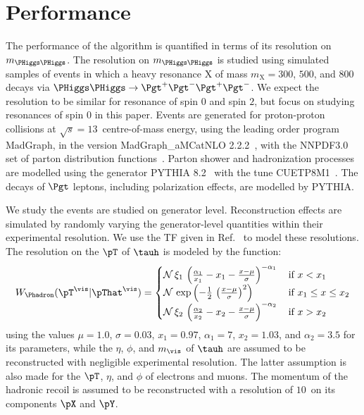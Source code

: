 \section{Performance}
\label{sec:performance}

The performance of the algorithm is quantified in terms of its resolution on $m_{\PHiggs\PHiggs}$.
The resolution on $m_{\PHiggs\PHiggs}$ is studied using simulated samples of events
in which a heavy resonance $\textrm{X}$ of mass $m_{\textrm{X}} = 300$, $500$, and $800$~\GeV
decays via $\PHiggs\PHiggs \to \Pgt^{+}\Pgt^{-}\Pgt^{+}\Pgt^{-}$.
We expect the resolution to be similar for resonance of spin $0$ and spin $2$,
but focus on studying resonances of spin $0$ in this paper.
Events are generated for proton-proton collisions at $\sqrt{s} = 13$~\TeV centre-of-mass energy,
using the leading order program MadGraph, in the version MadGraph\_aMCatNLO 2.2.2~\cite{MadGraph_aMCatNLO},
with the NNPDF3.0 set of parton distribution functions~\cite{NNPDF1,NNPDF2,NNPDF3}.
Parton shower and hadronization processes are modelled using the generator PYTHIA 8.2~\cite{pythia8} with the tune CUETP8M1~\cite{PYTHIA_CUETP8M1tune_CMS}.
The decays of $\Pgt$ leptons, including polarization effects, are modelled by PYTHIA.

We study the events are studied on generator level.
Reconstruction effects are simulated by randomly varying the generator-level quantities within their experimental resolution.
We use the TF given in Ref.~\cite{SVfitMEM} to model these resolutions.
The resolution on the $\pT$ of $\tauh$ is modeled by the function:
\begin{equation}
W_{\Phadron}( \pT^{\vis} | \pThat^{\vis} ) = 
 \begin{cases}
   \mathcal{N} \, \xi_{1} \, \left( \frac{\alpha_{1}}{x_{1}} - x_{1} - \frac{x - \mu}{\sigma} \right)^{-\alpha_{1}} \,  
 & \mbox{if } x < x_{1} \\
   \mathcal{N} \, \exp\left( -\frac{1}{2} \, \left( \frac{x - \mu}{\sigma} \right)^{2} \right) \,
 & \mbox{if } x_{1} \leq x \leq x_{2} \\
   \mathcal{N} \, \xi_{2} \, \left( \frac{\alpha_{2}}{x_{2}} - x_{2} - \frac{x - \mu}{\sigma} \right)^{-\alpha_{2}} \,
 & \mbox{if } x > x_{2} 
 \end{cases}
\label{eq:tf_tauToHadDecays_pT}
\end{equation}
using the values $\mu = 1.0$, $\sigma = 0.03$, $x_{1} = 0.97$, $\alpha_{1} = 7$,
$x_{2} = 1.03$, and $\alpha_{2} = 3.5$ for its parameters,
while the $\eta$, $\phi$, and $m_{\vis}$ of $\tauh$ are assumed to be reconstructed with negligible experimental resolution.
The latter assumption is also made for the $\pT$, $\eta$, and $\phi$ of electrons and muons.
The momentum of the hadronic recoil is assumed to be reconstructed with a resolution of $10$~\GeV on its components $\pX$ and $\pY$.

